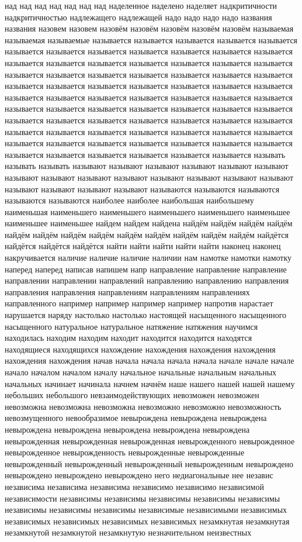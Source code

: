 над над над над над над над наделенное наделено наделяет надкритичности надкритичностью надлежащего надлежащей надо надо надо надо названия названия назовем назовем назовём назовём назовём назовём назовём называемая называемая называемые называется называется называется называется называется называется называется называется называется называется называется называется называется называется называется называется называется называется называется называется называется называется называется называется называется называется называется называется называется называется называется называется называется называется называется называется называется называется называется называется называется называется называется называется называется называется называется называется называется называется называется называется называется называется называется называется называется называется называется называется называется называется называется называется называется называется называется называется называется называется называется называется называется называется называть называть называть называют называют называют называют называют называют называют называют называют называют называют называют называют называют называют называют называют называют называются называются называются называются называются наиболее наиболее наибольшая наибольшему наименьшая наименьшего наименьшего наименьшего наименьшего наименьшее наименьшее наименьшее найдем найдем найдена найдём найдём найдём найдём найдём найдём найдём найдём найдём найдём найдём найдём найдём найдётся найдётся найдётся найдётся найти найти найти найти найти наконец наконец накручивается наличие наличие наличие наличии нам намотке намотки намотку наперед наперед написав напишем напр направление направление направление направлении направлении направлений направлению направлению направления направления направления направлениям направлениям направлениях направленного например например например например напротив нарастает нарушается наряду настолько настолько настоящей насыщенного насыщенного насыщенного натуральное натуральное натяжение натяжения научимся находилась находим находим находит находится находится находятся находящиеся находящихся нахождение нахождения нахождения нахождения нахождения нахождения начав начала начала начала начала начале начале начале начало началом началом началу начальное начальные начальным начальных начальных начинает начинала начнем начнём наше нашего нашей нашей нашему небольших небольшого невзаимодействующих невозможен невозможен невозможна невозможна невозможна невозможно невозможно невозможность невозмущенного невообразимое невырождена невырождена невырождена невырождена невырождена невырождена невырождена невырождена невырожденная невырожденная невырожденная невырожденного невырожденное невырожденное невырожденность невырожденные невырожденные невырожденный невырожденный невырожденный невырожденным невырождено невырождено невырождено невырождено него недиагональные нее независ независима независима независима независимо независимо независимой независимости независимы независимы независимы независимы независимы независимы независимы независимы независимые независимыми независимых независимых независимых независимых независимых незамкнутая незамкнутая незамкнутой незамкнутой незамкнутую незначительном неизвестных 